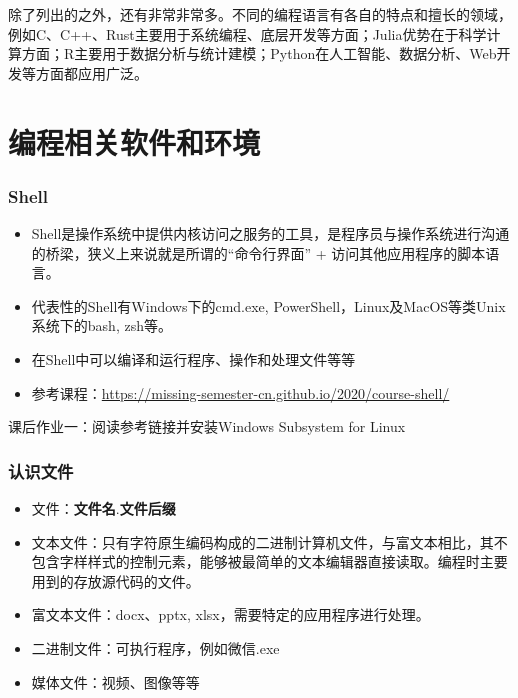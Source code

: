 \documentclass[10pt]{beamer}
\begin{document}
\begin{frame}
除了列出的之外，还有非常非常多。不同的编程语言有各自的特点和擅长的领域，例如C、C++、Rust主要用于系统编程、底层开发等方面；Julia优势在于科学计算方面；R主要用于数据分析与统计建模；Python在人工智能、数据分析、Web开发等方面都应用广泛。

\end{frame}

\section{编程相关软件和环境}

\begin{frame}
\frametitle{Shell}

\begin{itemize}
    \item Shell是操作系统中提供内核访问之服务的工具，是程序员与操作系统进行沟通的桥梁，狭义上来说就是所谓的“命令行界面” + 访问其他应用程序的脚本语言。
    \item 代表性的Shell有Windows下的cmd.exe, PowerShell，Linux及MacOS等类Unix系统下的bash, zsh等。
    \item 在Shell中可以编译和运行程序、操作和处理文件等等
    \item 参考课程：\url{https://missing-semester-cn.github.io/2020/course-shell/} 
\end{itemize}

课后作业一：阅读参考链接并安装Windows Subsystem for Linux


\end{frame}

\begin{frame}
\frametitle{认识文件}

\begin{itemize}
    \item 文件：\textbf{文件名}.\textbf{文件后缀}
    \item 文本文件：只有字符原生编码构成的二进制计算机文件，与富文本相比，其不包含字样样式的控制元素，能够被最简单的文本编辑器直接读取。编程时主要用到的存放源代码的文件。
    \item 富文本文件：docx、pptx, xlsx，需要特定的应用程序进行处理。
    \item 二进制文件：可执行程序，例如微信.exe
    \item 媒体文件：视频、图像等等
\end{itemize}


\end{frame}
\end{document}

